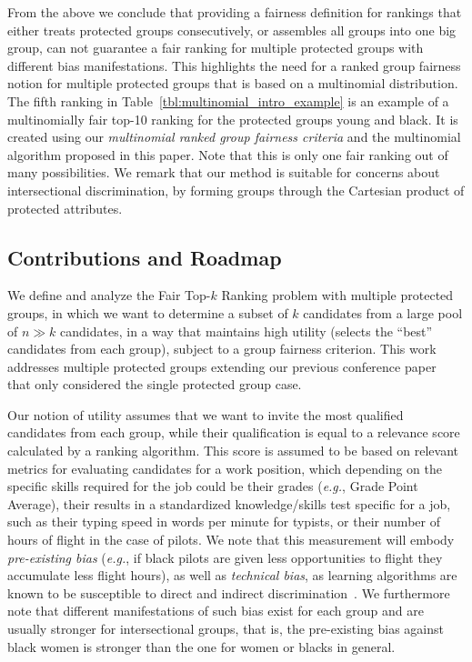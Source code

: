 From the above we conclude that providing a fairness definition for rankings that either treats protected groups consecutively, or assembles all groups into one big group, can not guarantee a fair ranking for multiple protected groups with different bias manifestations. 
%
This highlights the need for a ranked group fairness notion for multiple protected groups that is based on a multinomial distribution.
%
The fifth ranking in Table~\ref{tbl:multinomial_intro_example} is an example of a multinomially fair top-10 ranking for the protected groups young and black.
%
It is created using our \textit{multinomial ranked group fairness criteria} and the multinomial \algoFAIR algorithm proposed in this paper.
%
Note that this is only one fair ranking out of many possibilities.
%
We remark that our method is suitable for concerns about intersectional discrimination, by forming groups through the Cartesian product of protected attributes.

\subsection{Contributions and Roadmap}
We define and analyze the {\sc Fair Top-$k$ Ranking problem} with multiple protected groups, in which we want to determine a subset of $k$ candidates from a large pool of $n \gg k$ candidates, in a way that maintains high utility (selects the ``best'' candidates from each group), subject to a group fairness criterion. 
%
This work addresses multiple protected groups extending our previous conference paper~\cite{zehlike2017fair} that only considered the single protected group case.
%
%

Our notion of utility assumes that we want to invite the most qualified candidates from each group, while their qualification is equal to a relevance score calculated by a ranking algorithm.
%
This score is assumed to be based on relevant metrics for evaluating candidates for a work position, which depending on the specific skills required for the job could be their grades ({\em e.g.}, Grade Point Average), their results in a standardized knowledge/skills test specific for a job, such as their typing speed in words per minute for typists, or their number of hours of flight in the case of pilots.
%
We note that this measurement will embody \emph{pre-existing bias} ({\em e.g.}, if black pilots are given less opportunities to flight they accumulate less flight hours), as well as \emph{technical bias}, as learning algorithms are known to be susceptible to direct and indirect discrimination~\cite{tuto2016,HajianFerrer12}.
%
We furthermore note that different manifestations of such bias exist for each group and are usually stronger for intersectional groups, that is, the pre-existing bias against black women is stronger than the one for women or blacks in general.
%

